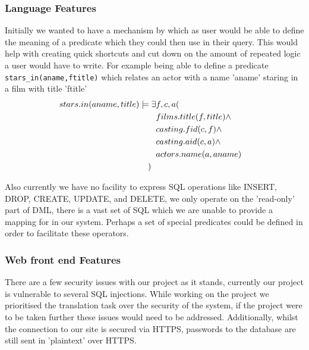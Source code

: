 \documentclass[a4paper, 11pt]{article}
\begin{document}
    \subsubsection{Language Features}
    Initially we wanted to have a mechanism by which as user would be able to
    define the meaning of a predicate which they could then use in their query.
    This would help with creating quick shortcuts and cut down on the amount of 
    repeated logic a user would have to write. For example being able to define a 
    predicate \texttt{stars\_in(aname,ftitle)} which relates an actor with a name 
    'aname' staring in a film with title 'ftitle'
    \begin{align*}
      stars.in(aname, title) \models \exists  & f,c,a (  &                                    \\
                                              & films.title(f,title) \land &                  \\
                                              & casting.fid(c,f) \land &                      \\
                                              & casting.aid(c,a) \land &                      \\
                                              & actors.name(a,aname) &                        \\
    ) \hspace{2mm} & &
    \end{align*}

    Also currently we have no facility to express SQL operations like INSERT, 
    DROP, CREATE, UPDATE, and DELETE, we only operate on the 'read-only' part 
    of DML, there is a vast set of SQL which we are unable to provide a mapping 
    for in our system. Perhaps a set of special predicates could be defined in
    order to facilitate these operators.
    
    \subsubsection{Web front end Features}
    There are a few security issues with our project as it stands, currently our 
    project is vulnerable to several SQL injections. While working on the project
    we prioritised the translation task over the security of the system, if the 
    project were to be taken further these issues would need to be addressed. 
    Additionally, whilst the connection to our site is secured via HTTPS, 
    passwords to the database are still sent in 'plaintext' over HTTPS.
    
\end{document}

